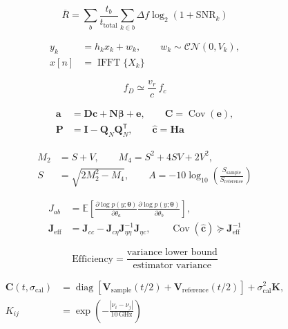 \documentclass{article}
\begin{document}
\newpage
\[\displaystyle \overline R=\sum_b\frac{t_b}{t_{\mathrm{total}}}\sum_{k\in b}\Delta f\log_2\!\left(1+\mathrm{SNR}_k\right)\]

\newpage
\[\displaystyle \begin{aligned}y_k&=h_kx_k+w_k,\qquad w_k\sim\mathcal{CN}(0,V_k),\\[4pt]x[n]&=\operatorname{IFFT}\{X_k\}\end{aligned}\]

\newpage
\[\displaystyle f_D\simeq\frac{v_r}{c}\,f_c\]

\newpage
\[\displaystyle \begin{aligned}\mathbf a&=\mathbf D\mathbf c+\mathbf N\boldsymbol\beta+\mathbf e,\qquad\mathbf C=\operatorname{Cov}(\mathbf e),\\[4pt]\mathbf P&=\mathbf I-\mathbf Q_N\mathbf Q_N^{\mathsf T},\qquad\widehat{\mathbf c}=\mathbf H\mathbf a\end{aligned}\]

\newpage
\[\displaystyle \begin{aligned}M_2&=S+V,\qquad M_4=S^2+4SV+2V^2,\\[4pt]S&=\sqrt{2M_2^2-M_4},\qquad A=-10\log_{10}\!\left(\frac{S_{\mathrm{sample}}}{S_{\mathrm{reference}}}\right)\end{aligned}\]

\newpage
\[\displaystyle \begin{aligned}J_{ab}&=\mathbb E\!\left[\frac{\partial\log p(y;\boldsymbol\theta)}{\partial\theta_a}\frac{\partial\log p(y;\boldsymbol\theta)}{\partial\theta_b}\right],\\[4pt]\mathbf J_{\mathrm{eff}}&=\mathbf J_{cc}-\mathbf J_{c\eta}\mathbf J_{\eta\eta}^{-1}\mathbf J_{\eta c},\qquad\operatorname{Cov}(\widehat{\mathbf c})\succeq\mathbf J_{\mathrm{eff}}^{-1}\end{aligned}\]

\newpage
\[\displaystyle \mathrm{Efficiency}=\frac{\text{variance lower bound}}{\text{estimator variance}}\]

\newpage
\[\displaystyle \begin{aligned}\mathbf C(t,\sigma_{\mathrm{cal}})&=\operatorname{diag}\!\left[\mathbf V_{\mathrm{sample}}(t/2)+\mathbf V_{\mathrm{reference}}(t/2)\right]+\sigma_{\mathrm{cal}}^2\mathbf K,\\[4pt]K_{ij}&=\exp\!\left(-\frac{|\nu_i-\nu_j|}{10\,\mathrm{GHz}}\right)\end{aligned}\]
\end{document}
